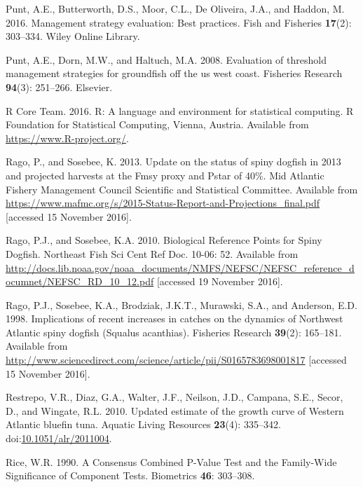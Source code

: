 \documentclass[]{article}
\begin{document}
\hypertarget{ref-punt2016management}{}
Punt, A.E., Butterworth, D.S., Moor, C.L., De Oliveira, J.A., and
Haddon, M. 2016. Management strategy evaluation: Best practices. Fish
and Fisheries \textbf{17}(2): 303--334. Wiley Online Library.

\hypertarget{ref-punt2008evaluation}{}
Punt, A.E., Dorn, M.W., and Haltuch, M.A. 2008. Evaluation of threshold
management strategies for groundfish off the us west coast. Fisheries
Research \textbf{94}(3): 251--266. Elsevier.

\hypertarget{ref-Rcite}{}
R Core Team. 2016. R: A language and environment for statistical
computing. R Foundation for Statistical Computing, Vienna, Austria.
Available from \url{https://www.R-project.org/}.

\hypertarget{ref-rago_update_2013}{}
Rago, P., and Sosebee, K. 2013. Update on the status of spiny dogfish in
2013 and projected harvests at the Fmsy proxy and Pstar of 40\%. Mid
Atlantic Fishery Management Council Scientific and Statistical
Committee. Available from
\url{https://www.mafmc.org/s/2015-Status-Report-and-Projections_final.pdf}
{[}accessed 15 November 2016{]}.

\hypertarget{ref-rago_biological_2010}{}
Rago, P.J., and Sosebee, K.A. 2010. Biological Reference Points for
Spiny Dogfish. Northeast Fish Sci Cent Ref Doc. 10-06: 52. Available
from
\url{http://docs.lib.noaa.gov/noaa_documents/NMFS/NEFSC/NEFSC_reference_documnet/NEFSC_RD_10_12.pdf}
{[}accessed 19 November 2016{]}.

\hypertarget{ref-rago_implications_1998}{}
Rago, P.J., Sosebee, K.A., Brodziak, J.K.T., Murawski, S.A., and
Anderson, E.D. 1998. Implications of recent increases in catches on the
dynamics of Northwest Atlantic spiny dogfish (Squalus acanthias).
Fisheries Research \textbf{39}(2): 165--181. Available from
\url{http://www.sciencedirect.com/science/article/pii/S0165783698001817}
{[}accessed 15 November 2016{]}.

\hypertarget{ref-restrepo_updated_2010}{}
Restrepo, V.R., Diaz, G.A., Walter, J.F., Neilson, J.D., Campana, S.E.,
Secor, D., and Wingate, R.L. 2010. Updated estimate of the growth curve
of Western Atlantic bluefin tuna. Aquatic Living Resources
\textbf{23}(4): 335--342.
doi:\href{https://doi.org/10.1051/alr/2011004}{10.1051/alr/2011004}.

\hypertarget{ref-Rice1990ATests}{}
Rice, W.R. 1990. A Consensus Combined P-Value Test and the Family-Wide
Significance of Component Tests. Biometrics \textbf{46}: 303--308.
\end{document}

